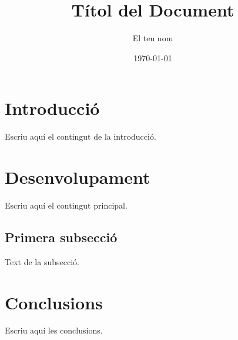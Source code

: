 \documentclass[12pt, a4paper]{article}
\title{\textcolor{colorprincipal}{\textbf{Títol del Document}}}
\author{El teu nom}
\date{\today}
\begin{document}
\maketitle
\tableofcontents
\newpage

\section{Introducció}
Escriu aquí el contingut de la introducció.

\section{Desenvolupament}
Escriu aquí el contingut principal.

\subsection{Primera subsecció}
Text de la subsecció.

\section{Conclusions}
Escriu aquí les conclusions.
\end{document}

